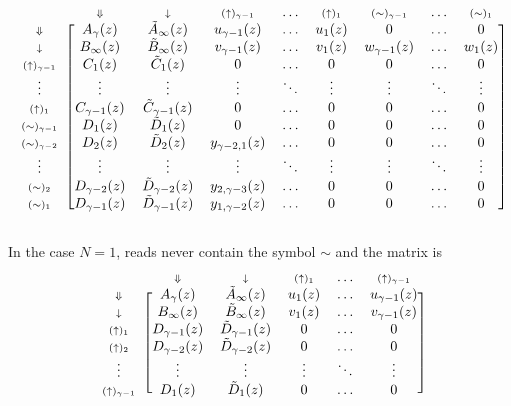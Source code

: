 \documentclass{article}
\newcommand{\DN}{\scriptstyle{\Downarrow}}
\newcommand{\dn}{\scriptstyle{\downarrow}}
\newcommand{\up}[1]{\scriptstyle{(\uparrow)_{#1}}}
\newcommand{\eq}[1]{\scriptstyle{(\sim)_{#1}}}
\begin{document}
\begin{equation*}
\begin{blockarray}{ccccccccc}
   & \DN & \dn &\up{\gamma-1} & \ldots & \up{1} &
    \eq{\gamma-1} & \ldots & \eq{1} \\
\begin{block}{c[cccccccc]}
\DN & A_\gamma(z) & \tilde{A}_\infty(z) & u_{\gamma-1}(z) & \ldots &
    u_1(z) & 0 & \ldots & 0 \\
\dn & B_\infty(z) & \tilde{B}_\infty(z) & v_{\gamma-1}(z) & \ldots &
    v_1(z) & w_{\gamma-1}(z) & \ldots & w_1(z) \\
\up{\gamma-1} & C_1(z) & \tilde{C}_1(z) & 0 & 
    \ldots & 0 & 0 & \ldots & 0 \\
\vdots & \vdots & \vdots & \vdots & \ddots & \vdots & \vdots &
    \ddots & \vdots \\
\up{1} & C_{\gamma-1}(z) & \tilde{C}_{\gamma-1}(z) & 0 & \ldots & 0 & 0 &
    \ldots & 0 \\
\eq{\gamma-1} & D_1(z) & \tilde{D}_1(z) & 0 & \ldots & 0 & 0 &
    \ldots & 0 \\
\eq{\gamma-2} & D_2(z) & \tilde{D}_2(z) & y_{\gamma-2,1}(z) &
    \ldots & 0 & 0 & \ldots & 0 \\
\vdots & \vdots & \vdots & \vdots & \ddots & \vdots & \vdots &
    \ddots & \vdots \\
\eq{2} & D_{\gamma-2}(z) & \tilde{D}_{\gamma-2}(z) &
    y_{2,\gamma-3}(z) & \ldots & 0 & 0 & \ldots & 0 \\
\eq{1} & D_{\gamma-1}(z) & \tilde{D}_{\gamma-1}(z) &
    y_{1,\gamma-2}(z) & \ldots & 0 & 0 & \ldots & 0 \\
\end{block}
\end{blockarray}
\end{equation*}

In the case $N = 1$, reads never contain the symbol $\sim$ and the matrix
is
\begin{equation*}
\begin{blockarray}{cccccc}
   & \DN & \dn & \up{1} & \ldots & \up{\gamma-1} \\
\begin{block}{c[ccccc]}
\DN & A_\gamma(z) & \tilde{A}_\infty(z) & u_1(z)
    & \ldots & u_{\gamma-1}(z) \\
\dn & B_\infty(z) & \tilde{B}_\infty(z) & v_1(z)
    & \ldots & v_{\gamma-1}(z) \\
\up{1} & D_{\gamma-1}(z) & \tilde{D}_{\gamma-1}(z) & 0 &
    \ldots & 0 \\
\up{2} & D_{\gamma-2}(z) & \tilde{D}_{\gamma-2}(z) & 0 &
    \ldots & 0  \\
\vdots & \vdots & \vdots & \vdots & \ddots & \vdots \\
\up{\gamma-1} & D_1(z) & \tilde{D}_1(z) & 0 & \ldots & 0 \\
\end{block}
\end{blockarray}
\end{equation*}
\end{document}
